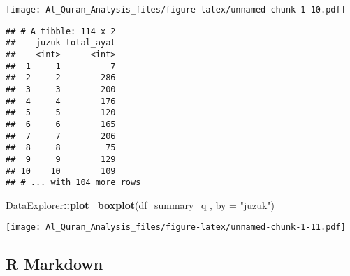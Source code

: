 \documentclass[]{article}
\newenvironment{Shaded}{\begin{snugshade}}{\end{snugshade}}
\newcommand{\DataTypeTok}[1]{\textcolor[rgb]{0.13,0.29,0.53}{#1}}
\newcommand{\KeywordTok}[1]{\textcolor[rgb]{0.13,0.29,0.53}{\textbf{#1}}}
\newcommand{\NormalTok}[1]{#1}
\newcommand{\OperatorTok}[1]{\textcolor[rgb]{0.81,0.36,0.00}{\textbf{#1}}}
\newcommand{\StringTok}[1]{\textcolor[rgb]{0.31,0.60,0.02}{#1}}
\begin{document}
\texttt{[image: Al\_Quran\_Analysis\_files/figure-latex/unnamed-chunk-1-10.pdf]}

\begin{Shaded}
\end{Shaded}

\begin{verbatim}
## # A tibble: 114 x 2
##    juzuk total_ayat
##    <int>      <int>
##  1     1          7
##  2     2        286
##  3     3        200
##  4     4        176
##  5     5        120
##  6     6        165
##  7     7        206
##  8     8         75
##  9     9        129
## 10    10        109
## # ... with 104 more rows
\end{verbatim}

\begin{Shaded}
\begin{Highlighting}[]
\NormalTok{DataExplorer}\OperatorTok{::}\KeywordTok{plot_boxplot}\NormalTok{(df_summary_q , }\DataTypeTok{by =} \StringTok{"juzuk"}\NormalTok{)}
\end{Highlighting}
\end{Shaded}

\texttt{[image: Al\_Quran\_Analysis\_files/figure-latex/unnamed-chunk-1-11.pdf]}

\hypertarget{r-markdown}{%
\subsection{R Markdown}\label{r-markdown}}
\end{document}
